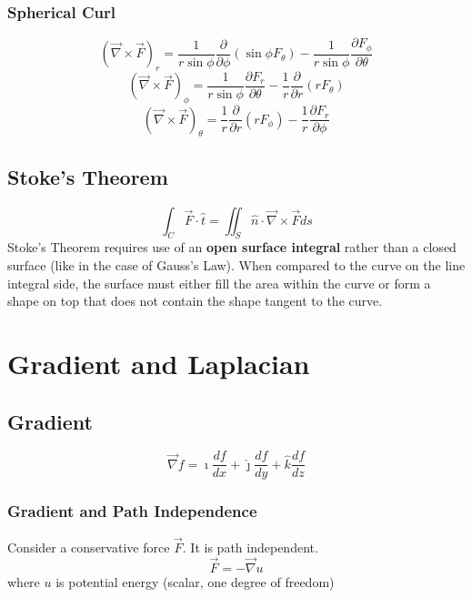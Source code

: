 \subsubsection{Spherical Curl}
\begin{equation}
	{(\vec{\nabla}\times \vec{F})}_{r}=\frac{1}{r\sin\phi}\frac{\partial}{\partial\phi}(\sin\phi F_{\theta})-\frac{1}{r\sin\phi}\frac{\partial F_{\phi}}{\partial\theta}
\end{equation}
\begin{equation}
	{(\vec{\nabla}\times \vec{F})}_{\phi}=\frac{1}{r\sin\phi}\frac{\partial F_{r}}{\partial\theta}-\frac{1}{r}\frac{\partial}{\partial r}(r F_{\theta})
\end{equation}
\begin{equation}
	{(\vec{\nabla}\times \vec{F})}_{\theta}=\frac{1}{r}\frac{\partial}{\partial r}(rF_{\phi})-\frac{1}{r}\frac{\partial F_{r}}{\partial\phi}
\end{equation}




\subsection{Stoke's Theorem}
\begin{equation}
	\int_{C}\vec{F}\cdot\hat{t}=\iint_{S}\hat{n}\cdot\vec{\nabla}\times \vec{F}ds
\end{equation}
Stoke's Theorem requires use of an \textbf{open surface integral} rather than a closed surface (like in the case of Gauss's Law). When compared to the curve on the line integral side, the surface must either fill the area within the curve or form a shape on top that does not contain the shape tangent to the curve.
\section{Gradient and Laplacian}
\subsection{Gradient}
\begin{equation}
	\vec{\nabla}f=\hat{\imath}\frac{df}{dx}+\hat{\jmath}\frac{df}{dy}+\hat{k}\frac{df}{dz}
\end{equation}

\subsubsection{Gradient and Path Independence}
Consider a conservative force $ \vec{F} $. It is path independent.
\begin{equation}
	\vec{F}=-\vec{\nabla}u
\end{equation}
where $ u $ is potential energy (scalar, one degree of freedom)



